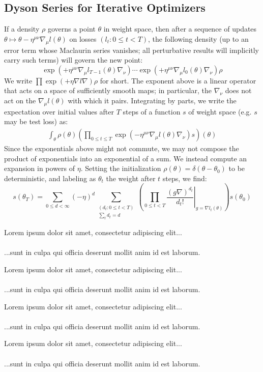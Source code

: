 \documentclass{article}
\newcommand{\lorem}[1]{
    Lorem ipsum dolor sit amet, consectetur adipiscing elit...\\
    \nopagebreak\vspace{#1cm} \ \\
    ...sunt in culpa qui officia deserunt mollit anim id est laborum.
}
\begin{document}
\subsection{Dyson Series for Iterative Optimizers}
    If a density $\rho$ governs a point $\theta$ in weight space, then after a
    sequence of updates $\theta \mapsto \theta - \eta^{\mu\nu} \nabla_\mu
    l(\theta)$ on losses $(l_t: 0\leq t < T)$, the following density (up to an
    error term whose Maclaurin series vanishes; all perturbative results will
    implicitly carry such terms) will govern the new point:
    \begin{equation}\label{eq:descexp}
        \exp\left(+\eta^{\mu\nu} \nabla_\mu l_{T-1}(\theta) \nabla_\nu\right)
        \cdots
        \exp\left(+\eta^{\mu\nu} \nabla_\mu l_0(\theta) \nabla_\nu\right)
        \rho
    \end{equation}
    We write 
    $
        \prod \exp\left(+\eta \nabla l \nabla\right) \rho
    $
    for short.
    The exponent above is a linear operator that acts on a space of
    sufficiently smooth maps; in particular, the $\nabla_\nu$ does not act on
    the $\nabla_\mu l(\theta)$ with which it pairs.  Integrating by parts, we
    write the expectation over initial values after $T$ steps of a function $s$
    of weight space (e.g. $s$ may be test loss) as:
    \begin{align}\label{eq:contraexp}
        \int_\theta \rho(\theta) \left(
            \prod_{0 \leq t \leq T} \exp\left(
                -\eta^{\mu\nu} \nabla_\mu l(\theta) \nabla_\nu
            \right) s
        \right)(\theta)
    \end{align}
    Since the exponentials above might not commute, we may not compose
    the product of exponentials into an exponential of a sum.  We instead
    compute an expansion in powers of $\eta$.  Setting the initialization
    $\rho(\theta) = \delta(\theta-\theta_0)$ to be deterministic, and labeling
    as $\theta_t$ the weight after $t$ steps, we find:
    \begin{equation}\label{eq:dyson}
        s(\theta_T) =
        \sum_{0\leq d < \infty} (-\eta)^d
        \sum_{\substack{(d_t: 0\leq t<T) \\ \sum_t d_t = d}}
        \left(
            \prod_{0 \leq t < T} \left.
                \frac{(g \nabla)^{d_t}}{d_t!}
            \right|_{g=\nabla l_t(\theta)}
        \right) s (\theta_0)
    \end{equation}

    \lorem{3}
    \lorem{3}
    \lorem{3}
    \lorem{3}
\end{document}
